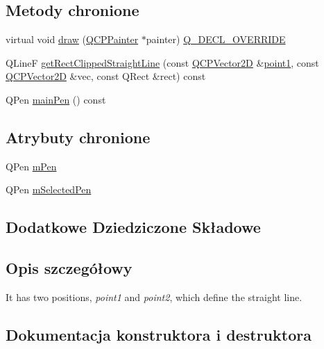 \subsection*{Metody chronione}
\begin{DoxyCompactItemize}
\item 
virtual void \hyperlink{class_q_c_p_item_straight_line_acbc84ad219bf4845152e4e2202fcaa3c}{draw} (\hyperlink{class_q_c_p_painter}{Q\+C\+P\+Painter} $\ast$painter) \hyperlink{qcustomplot_8hh_a42cc5eaeb25b85f8b52d2a4b94c56f55}{Q\+\_\+\+D\+E\+C\+L\+\_\+\+O\+V\+E\+R\+R\+I\+DE}
\item 
Q\+LineF \hyperlink{class_q_c_p_item_straight_line_a071f5b981adc2b9de103fb691001e317}{get\+Rect\+Clipped\+Straight\+Line} (const \hyperlink{class_q_c_p_vector2_d}{Q\+C\+P\+Vector2D} \&\hyperlink{class_q_c_p_item_straight_line_ac131a6ffe456f2cc7364dce541fe0120}{point1}, const \hyperlink{class_q_c_p_vector2_d}{Q\+C\+P\+Vector2D} \&vec, const Q\+Rect \&rect) const 
\item 
Q\+Pen \hyperlink{class_q_c_p_item_straight_line_a63ef39814c5b560dbb7b13e3fec1d940}{main\+Pen} () const 
\end{DoxyCompactItemize}
\subsection*{Atrybuty chronione}
\begin{DoxyCompactItemize}
\item 
Q\+Pen \hyperlink{class_q_c_p_item_straight_line_a15106ddc2ebd73ed5c1bc57aa92bee8f}{m\+Pen}
\item 
Q\+Pen \hyperlink{class_q_c_p_item_straight_line_a0307a0d56a018656adbf798bc84c2a4b}{m\+Selected\+Pen}
\end{DoxyCompactItemize}
\subsection*{Dodatkowe Dziedziczone Składowe}


\subsection{Opis szczegółowy}
 It has two positions, {\itshape point1} and {\itshape point2}, which define the straight line. 

\subsection{Dokumentacja konstruktora i destruktora}

